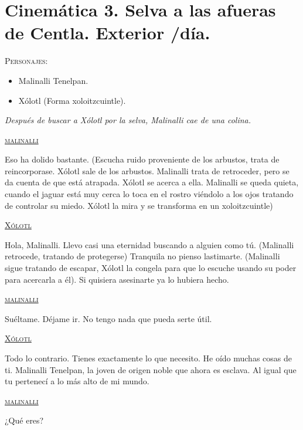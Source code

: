 \section{Cinemática 3. Selva a las afueras de Centla. Exterior /día.} \label{Cin:Cinematica03}
\textsc{Personajes}:
\begin{itemize}
	\item Malinalli Tenelpan.
	\item Xólotl (Forma xoloitzcuintle).
\end{itemize}
\textit{Después de buscar a Xólotl por la selva, Malinalli cae de una colina.}
\begin{center}
	\textsc{\underline{malinalli}}
	\\	
	\par
Eso ha dolido bastante.
(Escucha ruido proveniente de los arbustos, trata de reincorporase. Xólotl sale de los arbustos. Malinalli trata de retroceder, pero se da cuenta de que está atrapada. Xólotl se acerca a ella. Malinalli se queda quieta, cuando el jaguar está muy cerca lo toca en el rostro viéndolo a los ojos tratando de controlar su miedo. Xólotl la mira y se transforma en un xoloitzcuintle)
\\	
	\par
\textsc{\underline{Xólotl}}
\\	
	\par
Hola, Malinalli. Llevo casi una eternidad buscando a alguien como tú.
(Malinalli retrocede, tratando de protegerse)
Tranquila no pienso lastimarte.
(Malinalli sigue tratando de escapar, Xólotl la congela para que lo escuche usando su poder para acercarla a él).
Si quisiera asesinarte ya lo hubiera hecho.
\\	
	\par
\textsc{\underline{malinalli}}
\\	
	\par
Suéltame. Déjame ir. No tengo nada que pueda serte útil.
\\	
	\par
\textsc{\underline{Xólotl}}
\\	
	\par
Todo lo contrario. Tienes exactamente lo que necesito. He oído muchas cosas de ti. Malinalli Tenelpan, la joven de origen noble que ahora es esclava. Al igual que tu pertenecí a lo más alto de mi mundo.
\\	
	\par
\textsc{\underline{malinalli}}
\\	
	\par
¿Qué eres?

\end{center}
